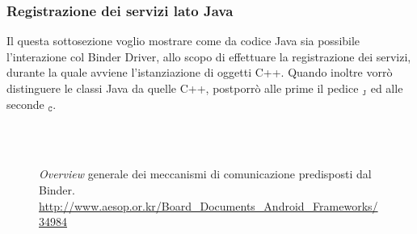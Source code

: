 
\subsubsection{Registrazione dei servizi lato Java}\label{subsec:regserv}
Il questa sottosezione voglio mostrare come da codice Java sia possibile
l'interazione col Binder Driver, allo scopo di effettuare la registrazione
dei servizi, durante la quale avviene l'istanziazione di oggetti C++.
Quando inoltre vorrò distinguere le classi Java da quelle C++, postporrò
alle prime il pedice $_\mathtt{J}$ ed alle seconde $_\mathtt{C}$.
\begin{list}{}{
  \setlength{\topsep}{0pt}
  \setlength{\leftmargin}{0pt}%
  \setlength{\rightmargin}{0pt}%
  \setlength{\listparindent}{0pt}%
  \setlength{\itemindent}{0pt}%
  \setlength{\parsep}{0pt}%
 }%
\item[]
\thispagestyle{empty}
\begin{figure}[p]
\centering
{}\\
\\
\caption{\textit{Overview} generale dei meccanismi di comunicazione predisposti dal
Binder.
\url{http://www.aesop.or.kr/Board_Documents_Android_Frameworks/34984}}
\label{fig:androidbinderoverview}
\end{figure}
\end{list}

